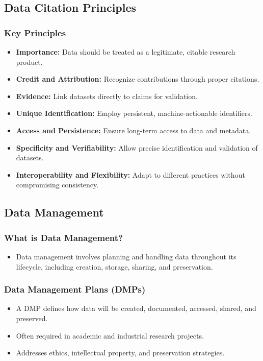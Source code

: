 \subsection{Data Citation Principles}
\subsubsection{Key Principles}
\begin{itemize}
    \item \textbf{Importance:} Data should be treated as a legitimate, citable research product.
    \item \textbf{Credit and Attribution:} Recognize contributions through proper citations.
    \item \textbf{Evidence:} Link datasets directly to claims for validation.
    \item \textbf{Unique Identification:} Employ persistent, machine-actionable identifiers.
    \item \textbf{Access and Persistence:} Ensure long-term access to data and metadata.
    \item \textbf{Specificity and Verifiability:} Allow precise identification and validation of datasets.
    \item \textbf{Interoperability and Flexibility:} Adapt to different practices without compromising consistency.
\end{itemize}

\subsection{Data Management}
\subsubsection{What is Data Management?}
\begin{itemize}
    \item Data management involves planning and handling data throughout its lifecycle, including creation, storage, sharing, and preservation.
\end{itemize}

\subsubsection{Data Management Plans (DMPs)}
\begin{itemize}
    \item A DMP defines how data will be created, documented, accessed, shared, and preserved.
    \item Often required in academic and industrial research projects.
    \item Addresses ethics, intellectual property, and preservation strategies.
\end{itemize}

